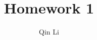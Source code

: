 \documentclass{iwork}
\title{Homework 1}
\author{Qin Li}
\begin{document}
\begin{iproblem}
  \lipsum[1]
  \begin{iparts}
    \ipart
    \lipsum[2]
    \begin{isubparts}
      \isubpart
      \lipsum[3]
      \isubpart
      \lipsum[4]
    \end{isubparts}
    \ipart
    \lipsum[5]
  \end{iparts}
\end{iproblem}
\begin{isolution}
  \lipsum[6]
  \begin{iparts}
    \ipart
    \lipsum[7]
    \begin{isubparts}
      \isubpart
      \lipsum[8]
      \isubpart
      \lipsum[9]
    \end{isubparts}
    \ipart
    \lipsum[10]
  \end{iparts}
\end{isolution}

\begin{iproblem}
  \lipsum[11]
\end{iproblem}
\begin{isolution}
  \lipsum[12]
\end{isolution}
\end{document}
